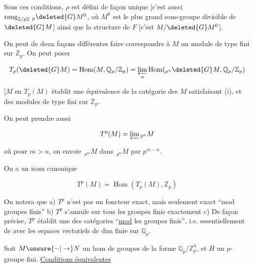 
Sous ces conditions, $\rho$ est défini de façon unique [c'est aussi $\operatorname{rang}_{\mathbb{Z}/p\mathbb{Z}}\,{}_p\deleted{G}M^0$, où $M^0$ est le plus grand sous-groupe divisible de $\deleted{G}M$] ainsi que la structure de $F$ [c'est $M/\deleted{G}M^0$].

On peut de deux façons différentes faire correspondre à $M$ un module de type fini sur $\mathbb{Z}_p$. On peut poser

\[
T_p(\deleted{G}M)=\operatorname{Hom}(M,\mathbb{Q}_p/\mathbb{Z}_p)=\underset{n}{\varprojlim}\operatorname{Hom}({}_{p^n}\deleted{G}M,\mathbb{Q}_p/\mathbb{Z}_p)
\]


[$M\text{ en }T_p(M)$ établit une équivalence de la catégorie des $M$ satisfaisant (i), et des modules de type fini sur $\mathbb{Z}_p$.

On peut prendre aussi

\[
T^p(M)=\varprojlim{}_{p^n}M
\]


où pour $m>n$, on envoie $\,{}_{p^m}M$ dans $\,{}_{p^n}M$ par $p^{m-n}$.



On a un isom canonique

\[
T^p(M)=\operatorname{Hom}(T_p(M),\mathbb{Z}_p)
\]

On notera que a) $T^p$ n'est pas un foncteur exact, mais seulement exact ``mod groupes finis'' b) $T^p$ s'annule sur tous les groupes finis exactement c) De façon précise, $T^p$ établit une  des catégories ``\uline{mod} les groupes finis'', i.e. essentiellement de  avec les espaces vectoriels de dim finie sur $\mathbb{Q}_p$.

Soit $M\unsure{\mathbin{-}|\to}N$ un hom de groupes de la forme $\mathbb{Q}_p/\mathbb{Z}_p^{h}$, et $H$ un $p$-groupe fini. \uline{Conditions équivalentes}

